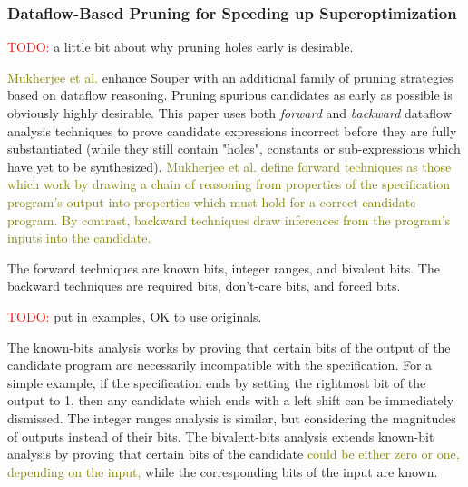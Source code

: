 \documentclass[12pt,twoside]{reedthesis}
\newcommand{\red}[1]{\textcolor{red}{#1}}
\newcommand{\green}[1]{\textcolor{olive}{#1}}
\newcommand{\addressed}[2]{{#1}}
\begin{document}
\subsubsection{Dataflow-Based Pruning for Speeding up Superoptimization}
    \red{TODO:} a little bit about why pruning holes early is desirable.

\green{Mukherjee et al.} \cite{mukherjee2020dataflow} enhance Souper with an additional family of pruning strategies based on dataflow reasoning. 
Pruning spurious candidates as early as possible is obviously highly desirable.
This paper uses both \textit{forward} and \textit{backward} dataflow analysis techniques to prove candidate expressions incorrect before they are fully substantiated (while they still contain "holes", constants or sub-expressions which have yet to be synthesized).
\green{
Mukherjee et al. define forward techniques as those which work by drawing a chain of reasoning from properties of the specification program's output into properties which must hold for a correct candidate program.
By contrast, backward techniques draw inferences from the program's inputs into the candidate.
}

The forward techniques are 
    known bits,
    integer ranges, and
    bivalent bits.
The backward techniques are 
    required bits,
    don't-care bits, and
    forced bits.
    
\red{TODO:} put in examples, OK to use originals.
    
The known-bits analysis works by proving that certain bits of the output of the candidate program are necessarily incompatible with the specification.
For a simple example, if the specification ends by setting the rightmost bit of the output to 1, then any candidate which ends with a left shift can be immediately dismissed.
The integer ranges analysis is similar, but considering the magnitudes of outputs instead of their bits.
The bivalent-bits analysis extends known-bit analysis by proving that certain bits of the candidate \green{could be either zero or one, depending on the input,}
while the corresponding bits of the input are known.
    
\end{document}
